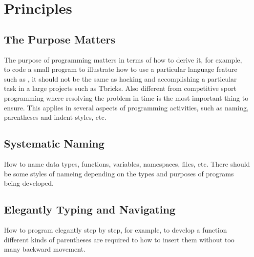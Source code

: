\section{Principles}

\subsection*{The Purpose Matters}
The purpose of programming matters in terms of how to derive it, for example,
to code a small program to illustrate how to use a particular language feature
such as , it should not be the same as
hacking and accomplishing a particular task in a large projects such as Tbricks.
Also different from competitive sport programming where resolving
the problem in time is the most important thing to ensure.
This applies in several aspects of programming activities, such as naming,
parentheses and indent styles, etc.

\subsection*{Systematic Naming}
How to name data types, functions, variables, namespaces, files, etc.
There should be some styles of nameing depending on the types and purposes
of programs being developed.

\subsection*{Elegantly Typing and Navigating}
How to program elegantly step by step, for example, to develop a function different kinds of
parentheses are required to how to insert them without too many backward movement.

